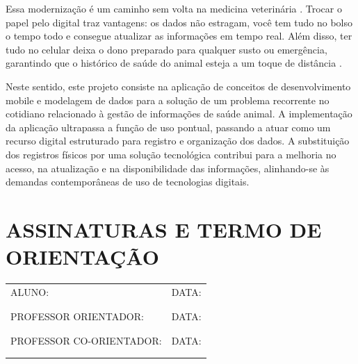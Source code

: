 \documentclass{UNESC}
\begin{document}
Essa modernização é um caminho sem volta na medicina veterinária \cite{MORAES2024}. Trocar o papel pelo digital traz vantagens: os dados não estragam, você tem tudo no bolso o tempo todo e consegue atualizar as informações em tempo real. Além disso, ter tudo no celular deixa o dono preparado para qualquer susto ou emergência, garantindo que o histórico de saúde do animal esteja a um toque de distância \cite{RODRIGUES2022}.

Neste sentido, este projeto consiste na aplicação de conceitos de desenvolvimento mobile e modelagem de dados para a solução de um problema recorrente no cotidiano relacionado à gestão de informações de saúde animal. A implementação da aplicação ultrapassa a função de uso pontual, passando a atuar como um recurso digital estruturado para registro e organização dos dados. A substituição dos registros físicos por uma solução tecnológica contribui para a melhoria no acesso, na atualização e na disponibilidade das informações, alinhando-se às demandas contemporâneas de uso de tecnologias digitais.


\section{\small ASSINATURAS E TERMO DE ORIENTAÇÃO}

\noindent\begin{tabular}{ | m{25em}  | m{2.5cm} | } 
  \hline
  ALUNO: &DATA: \\
  & \\ 
  & \\ 
  \hline
  PROFESSOR ORIENTADOR:&DATA:  \\
  & \\ 
  & \\ 
  \hline
  PROFESSOR CO-ORIENTADOR: &DATA:\\
  & \\ 
  & \\ 
  \hline
\end{tabular}



\renewcommand{\refname}{REFERÊNCIAS}
\end{document}
